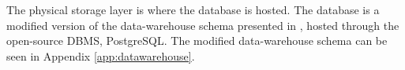 The physical storage layer is where the database is hosted. The database is a modified version of the data-warehouse schema presented in \cite{sw9_report}, hosted through the open-source DBMS, PostgreSQL\cite{postgresql}. The modified data-warehouse schema can be seen in Appendix \ref{app:datawarehouse}.